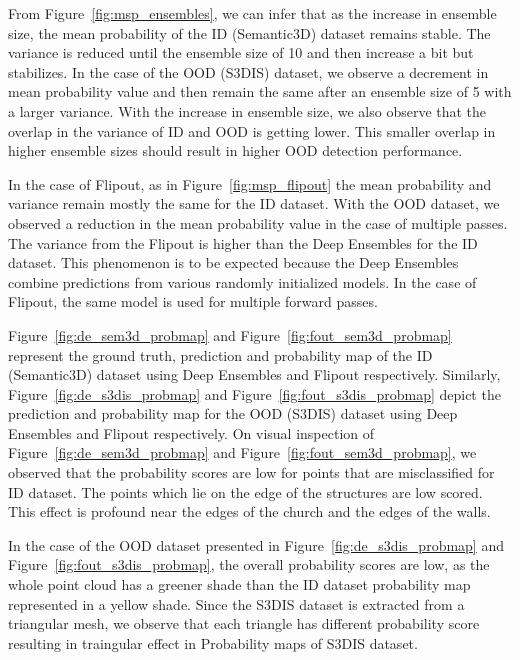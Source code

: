     From Figure~\ref{fig:msp_ensembles}, we can infer that as the increase in ensemble size, the mean probability of the ID (Semantic3D) dataset remains stable.
    The variance is reduced until the ensemble size of 10 and then increase a bit but stabilizes.
    In the case of the OOD (S3DIS) dataset, we observe a decrement in mean probability value and then remain the same after an ensemble size of 5 with a larger variance.
    With the increase in ensemble size, we also observe that the overlap in the variance of ID and OOD is getting lower.
    This smaller overlap in higher ensemble sizes should result in higher OOD detection performance.
    
    In the case of Flipout, as in Figure~\ref{fig:msp_flipout} the mean probability and variance remain mostly the same for the ID dataset.
    With the OOD dataset, we observed a reduction in the mean probability value in the case of multiple passes.
    The variance from the Flipout is higher than the Deep Ensembles for the ID dataset.
    This phenomenon is to be expected because the Deep Ensembles combine predictions from various randomly initialized models.
    In the case of Flipout, the same model is used for multiple forward passes.

    Figure~\ref{fig:de_sem3d_probmap} and Figure~\ref{fig:fout_sem3d_probmap} represent the ground truth, prediction and probability map of the ID (Semantic3D) dataset using Deep Ensembles and Flipout respectively.
    Similarly, Figure~\ref{fig:de_s3dis_probmap} and Figure~\ref{fig:fout_s3dis_probmap} depict the prediction and probability map for the OOD (S3DIS) dataset using Deep Ensembles and Flipout respectively.
    On visual inspection of Figure~\ref{fig:de_sem3d_probmap} and Figure~\ref{fig:fout_sem3d_probmap}, we observed that the probability scores are low for points that are misclassified for ID dataset.
    The points which lie on the edge of the structures are low scored.
    This effect is profound near the edges of the church and the edges of the walls.
    
    In the case of the OOD dataset presented in Figure~\ref{fig:de_s3dis_probmap} and Figure~\ref{fig:fout_s3dis_probmap}, the overall probability scores are low, as the whole point cloud has a greener shade than the ID dataset probability map represented in a yellow shade.
    Since the S3DIS dataset is extracted from a triangular mesh, we observe that each triangle has different probability score resulting in traingular effect in Probability maps of S3DIS dataset.

